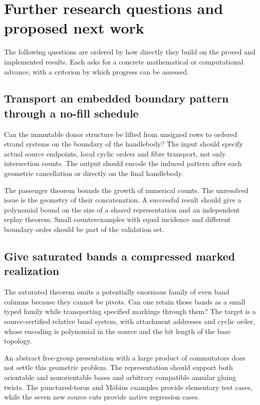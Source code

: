 \section{Further research questions and proposed next work}
\label{sec:research}

The following questions are ordered by how directly they build on the
proved and implemented results. Each asks for a concrete mathematical
or computational advance, with a criterion by which progress can be assessed.

\subsection{Transport an embedded boundary pattern through a no-fill schedule}

Can the immutable donor structure be lifted from unsigned rows to ordered
strand systems on the boundary of the handlebody? The input should specify
actual source endpoints, local cyclic orders and fibre transport, not only
intersection counts. The output should encode the induced pattern after
each geometric cancellation or directly on the final handlebody.

The passenger theorem bounds the growth of numerical counts. The unresolved
issue is the geometry of their concatenation. A successful result should
give a polynomial bound on the size of a shared representation and an
independent replay theorem. Small counterexamples with equal incidence
and different boundary order should be part of the validation set.

\subsection{Give saturated bands a compressed marked realization}

The saturated theorem omits a potentially enormous family of even band
columns because they cannot be pivots. Can one retain those bands as a
small typed family while transporting specified markings through them?
The target is a source-certified relative band system, with attachment
addresses and cyclic order, whose encoding is polynomial in the source
and the bit length of the base topology.

An abstract free-group presentation with a large product of commutators
does not settle this geometric problem. The representation should support
both orientable and nonorientable bases and arbitrary compatible annular
gluing twists. The punctured-torus and M\"obius examples provide elementary
test cases, while the seven new source cuts provide native regression cases.

